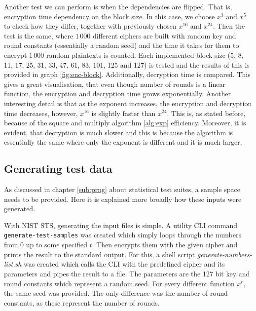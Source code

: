 \documentclass{Resources/UoBLab1}
\theoremstyle{definition}
\begin{document}
Another test we can perform is when the dependencies are flipped. That is, encryption time dependency on the block size. In this case, we choose $x^3$ and $x^5$ to check how they differ, together with previously chosen $x^{16}$ and $x^{24}$. Then the test is the same, where $1\,000$ different ciphers are built with random key and round constants (essentially a random seed) and the time it takes for them to encrypt $1\,000$ random plaintexts is counted. Each implemented block size (5, 8, 11, 17, 25, 31, 33, 47, 61, 83, 101, 125 and 127) is tested and the results of this is provided in graph \ref{fig:enc-block}. Additionally, decryption time is compared. This gives a great visualisation, that even though number of rounds is a linear function, the encryption and decryption time grows exponentially. Another interesting detail is that as the exponent increases, the encryption and decryption time decreases, however, $x^{16}$ is slightly faster than $x^{24}$. This is, as stated before, because of the square and multiply algorithm \ref{alg:exp} efficiency. Moreover, it is evident, that decryption is much slower and this is because the algorithm is essentially the same where only the exponent is different and it is much larger.

\subsection{Generating test data}\label{sub:generating-test-data}
As discussed in chapter \ref{sub:prng} about statistical test suites, a sample space needs to be provided. Here it is explained more broadly how these inputs were generated.

With NIST STS, generating the input files is simple. A utility CLI command \verb|generate-test-samples| was created which simply loops through the numbers from 0 up to some specified $t$. Then encrypts them with the given cipher and prints the result to the standard output. For this, a shell script \textit{generate-numbers-list.sh} was created which calls the CLI with the predefined cipher and its parameters and pipes the result to a file. The parameters are the 127 bit key and round constants which represent a random seed. For every different function $x^e$, the same seed was provided. The only difference was the number of round constants, as these represent the number of rounds.
\end{document}
